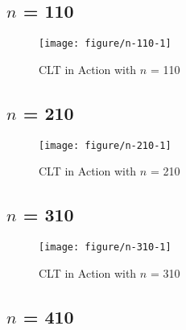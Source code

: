 \documentclass[11pt,letter]{article}\usepackage[]{graphicx}\usepackage[]{color}
\makeatletter
\def\maxwidth{ %
  \ifdim\Gin@nat@width>\linewidth
    \linewidth
  \else
    \Gin@nat@width
  \fi
}
\newenvironment{knitrout}{}{} %
\makeatother
\begin{document}
\subsection{$n$ = 110}

\begin{knitrout}
\color{fgcolor}\begin{figure}[h]

{\centering \texttt{[image: figure/n-110-1]} 

}

\caption[CLT in Action with $n$ = 110]{CLT in Action with $n$ = 110}\label{fig:n-110}
\end{figure}


\end{knitrout}
\newpage
\subsection{$n$ = 210}

\begin{knitrout}
\color{fgcolor}\begin{figure}[h]

{\centering \texttt{[image: figure/n-210-1]} 

}

\caption[CLT in Action with $n$ = 210]{CLT in Action with $n$ = 210}\label{fig:n-210}
\end{figure}


\end{knitrout}
\newpage
\subsection{$n$ = 310}

\begin{knitrout}
\color{fgcolor}\begin{figure}[h]

{\centering \texttt{[image: figure/n-310-1]} 

}

\caption[CLT in Action with $n$ = 310]{CLT in Action with $n$ = 310}\label{fig:n-310}
\end{figure}


\end{knitrout}
\newpage
\subsection{$n$ = 410}
\end{document}
